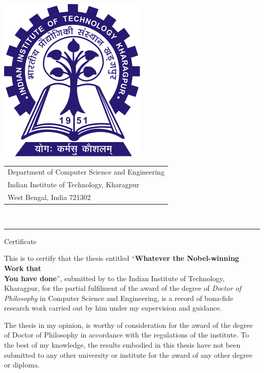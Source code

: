 \documentclass[12pt,a4paper,openright,notitlepage]{extreport}
\begin{document}
\vspace*{-50pt}
\noindent
\begin{minipage}{0.2\linewidth}
\includegraphics[scale=0.2]{icons/iitkgp.png}
\end{minipage}%
\begin{minipage}{0.\linewidth}
\begin{flushleft}
    \begin{tabular}{l}
    Department of Computer Science and Engineering\\
    Indian Institute of Technology, Kharagpur\\
    West Bengal, India 721302
    \end{tabular}
\end{flushleft}
\end{minipage}\\

\noindent\rule{\textwidth}{0.4pt}
\vspace*{20pt}
\begin{center}
    \LARGE Certificate
\end{center}


This is to certify that the thesis entitled ``\textbf{Whatever the Nobel-winning Work that\\ You have done}'', submitted by \textbf{\myname} to the Indian Institute of Technology, Kharagpur, for the partial fulfilment of the award of the degree of \emph{Doctor of Philosophy} in Computer Science and Engineering, is a record of bona-fide research work carried out by him under my supervision and guidance.

The thesis in my opinion, is worthy of consideration for the award of the degree of Doctor of Philosophy in accordance with the regulations of the institute. To the best of my knowledge, the results embodied in this thesis have not been submitted to any other university or institute for the award of any other degree or diploma.
\vspace{50pt}
\end{document}
